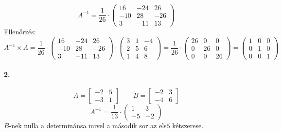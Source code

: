 \documentclass[12pt,a4paper,fleqn]{article}
\newcommand{\myparagraph}[1]{\paragraph{#1}\mbox{}}
\begin{document}
\[
  A^{-1} = \dfrac{1}{26} \cdot
  \begin{pmatrix}
    16 & -24 & 26 \\
    -10 & 28 & -26 \\
    3 & -11 & 13
  \end{pmatrix}
\]
Ellenőrzés:
\[
  A^{-1} \times A =
  \dfrac{1}{26} \cdot
  \begin{pmatrix}
    16 & -24 & 26 \\
    -10 & 28 & -26 \\
    3 & -11 & 13
  \end{pmatrix}
  \cdot
  \begin{pmatrix}
    3 & 1 & -4 \\
    2 & 5 & 6 \\
    1 & 4 & 8
  \end{pmatrix}
  =
  \dfrac{1}{26} \cdot
  \begin{pmatrix}
    26 & 0  & 0 \\
    0  & 26 & 0 \\
    0  & 0  & 26
  \end{pmatrix}
  =
  \begin{pmatrix}
    1 & 0  & 0 \\
    0  & 1 & 0 \\
    0  & 0  & 1
  \end{pmatrix}
\]


\myparagraph{2.}
\[
  A = \begin{bmatrix} -2 & 5 \\ -3 & 1 \end{bmatrix}
  \qquad
  B = \begin{bmatrix} -2 & 3 \\ -4 & 6 \end{bmatrix}
\]
\[
  A^{-1} = \dfrac{1}{13} \cdot \begin{pmatrix} 1 & 3 \\ -5 & -2 \end{pmatrix}
\]
$B$-nek nulla a determinánsa mivel a második sor az első kétszerese.

\clearpage
\tableofcontents
\end{document}
